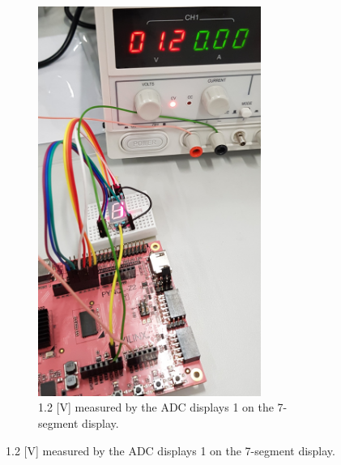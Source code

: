 \documentclass[../report.tex]{subfiles}
\begin{document}
\begin{figure}[H]
\begin{subfigure}[t]{0.45\textwidth}
        \includegraphics[width=0.8\textwidth]{figures/xadc/1V_result.jpg}
        \captionsetup{width=0.8\textwidth}
        \caption{1.2 [V] measured by the ADC displays 1 on the 7-segment display.}  
        \label{}
    \end{subfigure}
    

\end{figure}
\end{document}
